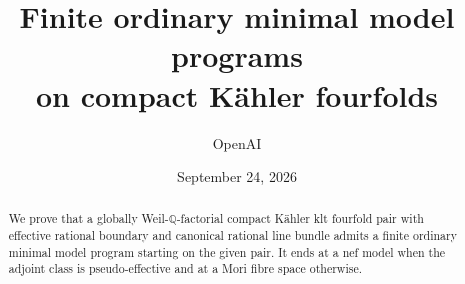 \documentclass[11pt,reqno]{amsart}
\title[Minimal model programs on Kähler fourfolds]{Finite ordinary minimal model programs\\on compact Kähler fourfolds}
\author{OpenAI}
\date{September 24, 2026}
\theoremstyle{definition}
\theoremstyle{remark}
\numberwithin{equation}{section}
\newcommand{\Q}{\mathbb Q}
\begin{document}
\begin{abstract}
We prove that a globally Weil-$\Q$-factorial compact Kähler klt fourfold pair with effective rational boundary and canonical rational line bundle admits a finite ordinary minimal model program starting on the given pair. It ends at a nef model when the adjoint class is pseudo-effective and at a Mori fibre space otherwise.
\end{abstract}
\maketitle
\tableofcontents







\appendix

\enlargethispage{2\baselineskip}

\begingroup
\renewcommand{\baselinestretch}{0.95}

\endgroup
\end{document}
